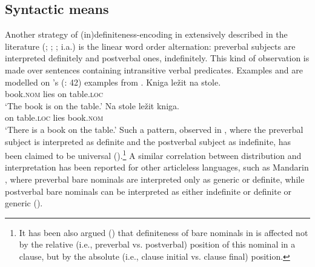 \documentclass[output=paper,
colorlinks,
citecolor=brown,
newtxmath
]{langscibook}
\begin{document}
\subsection{Syntactic means}
Another strategy of (in)definiteness-encoding in  extensively described in the literature (\citealt{Pospelov1970}; \citealt{Fursenko1970}; \citealt{Chvany1973}; %
i.a.) is the linear word order alternation:
preverbal subjects are interpreted definitely and postverbal ones, indefinitely. This kind of observation is made over sentences containing intransitive verbal predicates. Examples  and  are modelled on \citeauthor{Kramsky1972}'s (\citeyear{Kramsky1972}: 42) examples from .%
\ea
\ea \label{ex:seres:9}
\gll Kniga			ležit	na	stole.\\
book.\textsc{nom} 	lies	on	table.\textsc{loc}\\
\glt `The book is on the table.'
\ex \label{ex:seres:10}
\gll Na		stole			ležit	kniga.\\
on	table.\textsc{loc} 	lies	book.\textsc{nom}\\
\glt `There is a book on the table.'
\z \z
\noindent Such a pattern, observed in , where the preverbal subject is interpreted as definite and the postverbal subject as indefinite, has been claimed to be universal (\citealt{Leiss2007}).\footnote{It has been also argued (\citealt{Simik.Burianova2020}) that definiteness of bare nominals in  is affected not by the relative (i.e., preverbal vs. postverbal) position of this nominal in a clause, but by the absolute (i.e., clause initial vs. clause final) position.}  A similar correlation between distribution and interpretation has been reported for
other articleless languages,
such as Mandarin , where preverbal bare nominals are interpreted only as generic or definite,
while postverbal bare nominals can be interpreted as either indefinite or definite or generic (\citealt{Cheng.Sybesma2014}).
\end{document}
